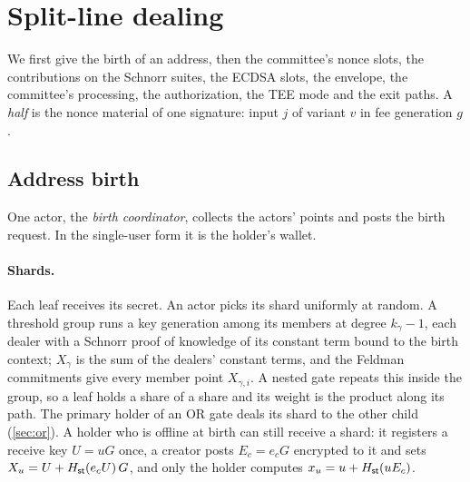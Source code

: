 \section{Split-line dealing}\label{sec:construction}

We first give the birth of an address, then the committee's nonce slots, the contributions on the Schnorr suites, the ECDSA slots, the envelope, the committee's processing, the authorization, the TEE mode and the exit paths. A \emph{half} is the nonce material of one signature: input $j$ of variant $v$ in fee generation $g$.

\subsection{Address birth}\label{sec:birth}

One actor, the \emph{birth coordinator}, collects the actors' points and posts the birth request. In the single-user form it is the holder's wallet.

\paragraph{Shards.} Each leaf receives its secret. An actor picks its shard uniformly at random. A threshold group runs a key generation among its members at degree $k_\gamma - 1$, each dealer with a Schnorr proof of knowledge of its constant term bound to the birth context; $X_\gamma$ is the sum of the dealers' constant terms, and the Feldman commitments give every member point $X_{\gamma,i}$. A nested gate repeats this inside the group, so a leaf holds a share of a share and its weight is the product along its path. The primary holder of an OR gate deals its shard to the other child (\cref{sec:or}). A holder who is offline at birth can still receive a shard: it registers a receive key $U = uG$ once, a creator posts $E_c = e_c G$ encrypted to it and sets $X_u = U + H_{\mathsf{st}}(e_c U)\,G$, and only the holder computes $x_u = u + H_{\mathsf{st}}(u E_c)$.

